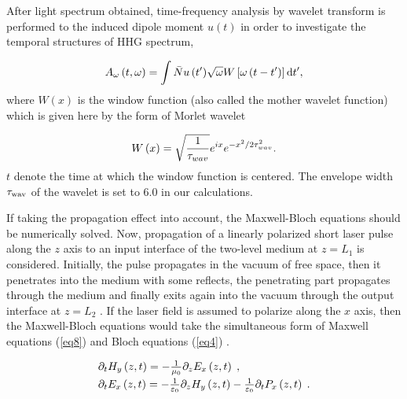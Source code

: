 \documentclass[10pt,letterpaper]{article}
\begin{document}
After light spectrum obtained, time-frequency analysis by wavelet transform is performed to the induced dipole moment ${u}\left( t \right)$ in order to investigate the temporal structures of HHG spectrum,

\begin{equation}
{A_\omega }\left( {t,\omega } \right) = \int {\bar{N}{u}\left( {t'} \right)} \sqrt \omega  {W}\left[ {\omega \left( {t - t'} \right)} \right]{\rm{d}}t',
\label{eq6}
\end{equation}
where  $ {W}(x) $ is the window function (also called the mother wavelet function) which is given here by the form of Morlet wavelet \cite{CuiNi2010NJP-wavelet,MyOE2013,MyOE2015,TongXiaoMin2000PRA-Wavelet}

\begin{equation}
{{W}}\left( x \right) = \sqrt {\frac{{\rm{1}}}{{{\tau _{wav}}}}} {e^{ix}}{e^{ - {x^2}/2\tau _{wav}^2}}.
\label{eq7}
\end{equation}
$ t $ denote the time at which the window function is centered. The envelope width $ \tau_{\rm{wav}} $ of the wavelet is set to 6.0 in our calculations.

If taking the propagation effect into account, the Maxwell-Bloch equations should be numerically solved. Now, propagation of a linearly polarized short laser pulse along the $ z $ axis to an input interface of the two-level medium at $ z=L_{1} $ is considered. Initially, the pulse propagates in the vacuum of free space, then it penetrates into the medium with some reflects, the penetrating part propagates through the medium and finally exits again into the vacuum through the output interface at $ z=L_{2} $ \cite{Kalosha-Two-Level-PRL-1999}. If the laser field is assumed to polarize along  the $ x $ axis, then the Maxwell-Bloch equations would take the simultaneous form of Maxwell equations (\ref{eq8}) and Bloch equations (\ref{eq4}) .

\begin{equation}
\begin{array}{l}
\smallskip
{\partial _t}{H_y}\left( {z,t} \right) =  - \frac{1}{{{\mu _0}}}{\partial _z}{E_x}\left( {z,t} \right)\;,\\
\smallskip
{\partial _t}{E_x}\left( {z,t} \right) =  - \frac{1}{{{\varepsilon _0}}}{\partial _z}{H_y}\left( {z,t} \right) - \frac{1}{{{\varepsilon _0}}}{\partial _t}{P_x}\left( {z,t} \right)\;.\\
\end{array}
\label{eq8}
\end{equation}
\end{document}
